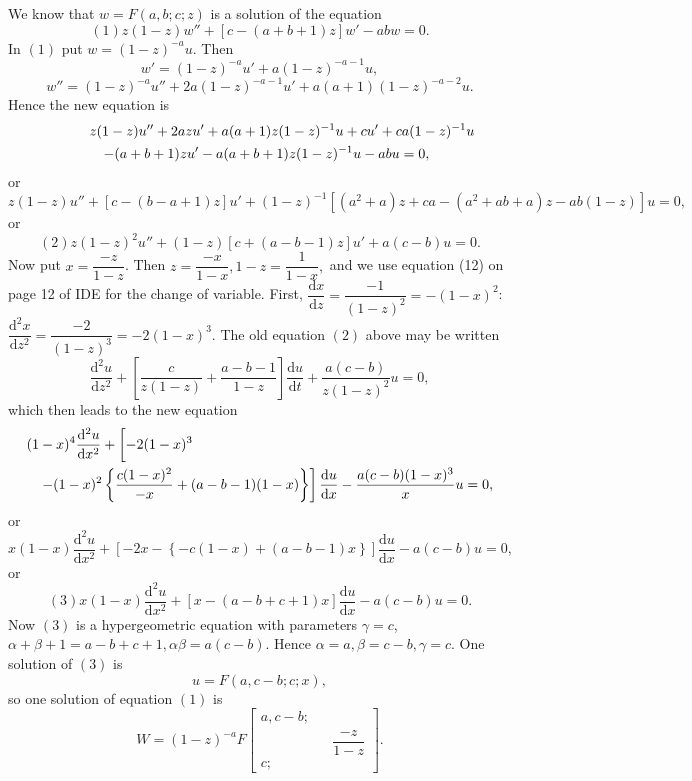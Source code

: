 \begin{solution}
We know that $w = F(a,b;c;z)$ is a solution of the equation
$$(1) z(1-z)w'' + [c-(a+b+1)z]w' - abw = 0.$$
In $(1)$ put $w = (1-z)^{-a}u$. Then
$$w' = (1-z)^{-a}u' + a(1-z)^{-a-1}u,$$
$$w'' = (1-z)^{-a}u'' + 2a(1-z)^{-a-1}u' + a(a+1)(1-z)^{-a-2}u.$$
Hence the new equation is
\begin{eqnarray*}
\lefteqn{z(1-z)u'' + 2azu' + a(a+1)z(1-z)^{-1}u + cu' + ca(1-z)^{-1}u} \\
& & - (a+b+1)zu' - a(a+b+1)z(1-z)^{-1}u - abu = 0,
\end{eqnarray*}
or
$$z(1-z)u'' + [c - (b-a+1)z]u' + (1-z)^{-1} [(a^2+a)z + ca - (a^2+ab+a)z - ab(1-z)]u=0,$$
or
$$(2) z(1-z)^2u'' + (1-z)[c+(a-b-1)z] u' + a(c-b)u = 0.$$
Now put $x = \dfrac{-z}{1-z}$. Then $z = \dfrac{-x}{1-x}, 1-z = \dfrac{1}{1-x},$ and we use equation (12) on page 12 of IDE for the change of variable.
First, $\dfrac{\mathrm{d}x}{\mathrm{d}z} = \dfrac{-1}{(1-z)^2} = -(1-x)^2$: $\dfrac{\mathrm{d}^2x}{\mathrm{d}z^2} = \dfrac{-2}{(1-z)^3} = -2(1-x)^3.$
The old equation $(2)$ above may be written
$$\dfrac{\mathrm{d}^2u}{\mathrm{d}z^2} + \left[ \dfrac{c}{z(1-z)} + \dfrac{a-b-1}{1-z} \right] \dfrac{\mathrm{d}u}{\mathrm{d}t} + \dfrac{a(c-b)}{z(1-z)^2}u = 0,$$
which then leads to the new equation
\begin{eqnarray*}
\lefteqn{(1-x)^4 \dfrac{\mathrm{d}^2u}{\mathrm{d}x^2} + \left[ -2(1-x)^3 \phantom{\dfrac{1}{1}} \right.} \\
& & \left. - (1-x)^2 \left\{ \dfrac{c(1-x)^2}{-x} + (a-b-1)(1-x) \right\} \right] \dfrac{\mathrm{d}u}{\mathrm{d}x} - \dfrac{a(c-b)(1-x)^3}{x}u = 0,
\end{eqnarray*}
or
$$x(1-x) \dfrac{\mathrm{d}^2u}{\mathrm{d}x^2} + \left[ -2x - \left\{ -c (1-x) + (a-b-1)x \right\} \right] \dfrac{\mathrm{d}u}{\mathrm{d}x} - a(c-b)u = 0,$$
or
$$(3) x(1-x) \dfrac{\mathrm{d}^2u}{\mathrm{d}x^2} + [x - (a-b+c+1)x ] \dfrac{\mathrm{d}u}{\mathrm{d}x} - a(c-b)u =0.$$
Now $(3)$ is a hypergeometric equation with parameters $\gamma = c$, $\alpha + \beta + 1 = a - b + c + 1, \alpha \beta = a(c-b)$. 
Hence $\alpha=a, \beta = c-b, \gamma =c$. One solution of $(3)$ is
$$u = F(a,c-b;c;x),$$
so one solution of equation $(1)$ is 
$$W = (1-z)^{-a} F \left[ \begin{array}{rlr}
a, c-b; & & \\
& & \dfrac{-z}{1-z} \\
c; & &
\end{array} \right].$$
\end{solution}
